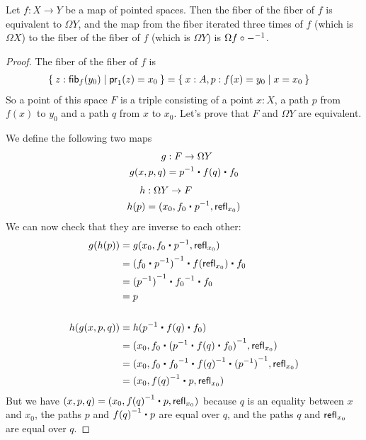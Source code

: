 \begin{lem}
  Let $f:X\to Y$ be a map of pointed spaces. Then the fiber of the fiber of $f$
  is equivalent to $\Omega Y$, and the map from the fiber iterated three times
  of $f$ (which is $\Omega X$) to the fiber of the fiber of $f$ (which is
  $\Omega Y$) is $\Omega f\circ\mathord{{-}^{-1}}$.
\end{lem}
\begin{proof}
  The fiber of the fiber of $f$ is
  \begin{align*}
    \setof{z:\hfib{f}{y_0} | \proj{1}(z) = x_0} &=
    \setof{x:A,p:f(x)=y_0 | x = x_0}
  \end{align*}
  So a point of this space $F$ is a triple consisting of a point $x:X$, a path
  $p$ from $f(x)$ to $y_0$ and a path $q$ from $x$ to $x_0$. Let’s prove that
  $F$ and $\Omega Y$ are equivalent.

  We define the following two maps
  \begin{align*}
    g &: F \to \Omega Y\\
    g(x,p,q) &= \rev{p}\ct\ap{f}{q}\ct f_0
  \end{align*}
  \begin{align*}
    h &: \Omega Y \to F\\
    h(p) &= (x_0, f_0\ct\rev{p}, \refl{x_0})
  \end{align*}
  We can now check that they are inverse to each other:
  \begin{align*}
    g(h(p)) &= g(x_0, f_0\ct\rev{p}, \refl{x_0}) \\
    &= \rev{(f_0\ct\rev{p})}\ct\ap{f}{\refl{x_0}}\ct f_0 \\
    &= \rev{(\rev{p})}\ct\rev{f_0}\ct f_0 \\
    &= p\\
    &\\
    h(g(x,p,q)) &= h(\rev{p}\ct\ap{f}{q}\ct f_0)\\
    &= (x_0, f_0\ct\rev{(\rev{p}\ct\ap{f}{q}\ct f_0)}, \refl{x_0}) \\
    &= (x_0, f_0\ct\rev{f_0}\ct\rev{\ap{f}{q}}\ct\rev{(\rev{p})}, \refl{x_0}) \\
    &= (x_0, \rev{\ap{f}{q}}\ct p, \refl{x_0}) \\
  \end{align*}
  But we have $(x,p,q)=(x_0, \rev{\ap{f}{q}}\ct p, \refl{x_0})$ because $q$ is
  an equality between $x$ and $x_0$, the paths $p$ and $\rev{\ap{f}{q}}\ct p$
  are equal over $q$, and the paths $q$ and $\mathsf{refl}_{x_0}$ are equal over $q$.


\end{proof}
